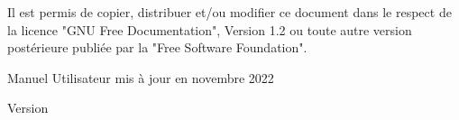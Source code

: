 {\begin{titlepage}
\begin{flushleft}
    Il est permis de copier, distribuer et/ou modifier ce document dans le respect de la licence "GNU Free Documentation", Version 1.2 ou toute autre version postérieure publiée par la "Free Software Foundation".

    Manuel Utilisateur mis à jour en novembre 2022
    \end{flushleft}
    \end{titlepage}
    \pagestyle{headings}
}{%
    \begin{titlepage}
        \large{Version \DocVersion}
    \end{titlepage}
    \clearemptydoublepage \pagestyle{headings}
    \clearemptydoublepage {}
}
\makeatother
